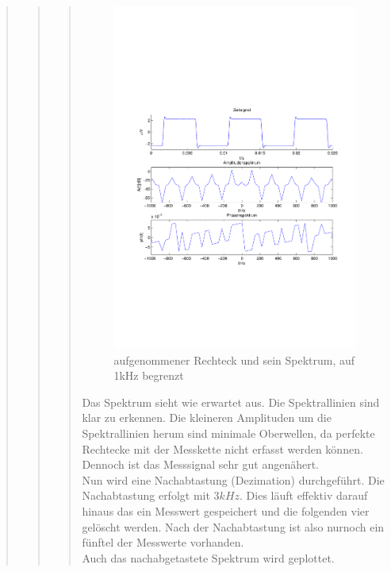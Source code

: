 \begin{quote}
\begin{quote}
\begin{quote}
            \begin{figure}[H]
            \centering
                \includegraphics[scale=0.7, trim = 1.5cm 6.5cm 1cm 7.5cm,
                clip]{./Bilder/rechteck_100Hz_15kHz_frequenzbegrenzung.pdf}
                   \caption{aufgenommener Rechteck und sein Spektrum, auf 1kHz begrenzt}
            \end{figure}
    
        
            Das Spektrum sieht wie erwartet aus. Die Spektrallinien sind klar zu
            erkennen. Die kleineren Amplituden um die Spektrallinien herum sind minimale Oberwellen, da perfekte Rechtecke mit der
            Messkette nicht erfasst werden können. Dennoch ist das Messsignal sehr gut angenähert.\\
            Nun wird eine Nachabtastung (Dezimation) durchgeführt. Die Nachabtastung erfolgt mit $3kHz$. Dies
            läuft effektiv darauf hinaus das ein Messwert gespeichert und die folgenden vier gelöscht werden.
            Nach der Nachabtastung ist also nurnoch ein fünftel der Messwerte vorhanden.\\
            Auch das nachabgetastete Spektrum wird geplottet.
            

\end{quote}
\end{quote}
\end{quote}
